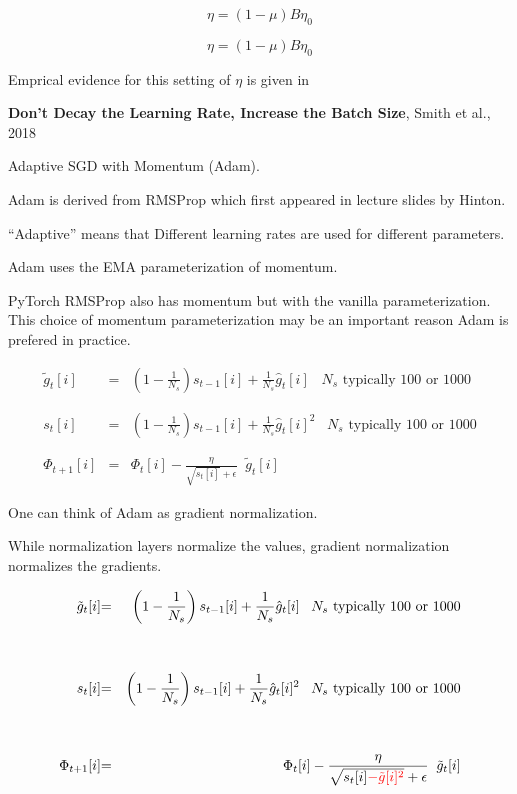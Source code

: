 {\vfill
{\color{red} $$\eta = (1-\mu)B\eta_0$$}


{\color{red} $$\eta = (1-\mu)B\eta_0$$}

\vfill
Emprical evidence for this setting of $\eta$ is given in

\vfill
{\bf Don't Decay the Learning Rate, Increase the Batch Size}, Smith et al., 2018


Adaptive SGD with Momentum (Adam).

\vfill
Adam is derived from RMSProp which first appeared in lecture slides by Hinton.

\vfill
``Adaptive'' means that Different learning rates are used for different parameters.


Adam uses the EMA parameterization of momentum.

\vfill
PyTorch RMSProp also has momentum but with the vanilla parameterization.
\vfill
This choice of momentum  parameterization may be an important reason Adam is prefered in practice.


\begin{eqnarray*}
{ \tilde{g}_t[i]} & { =} & { \left(1-\frac{1}{N_s}\right) s_{t-1}[i] + \frac{1}{N_s} \hat{g}_t[i]}\;\;\;\mbox{$N_s$ typically 100 or 1000} \\
\\
\\
{ s_t[i]} & { =} & { \left(1-\frac{1}{N_s}\right) s_{t-1}[i] + \frac{1}{N_s} \hat{g}_t[i]^2}\;\;\;\mbox{$N_s$ typically 100 or 1000} \\
\\
\\
{ \Phi_{t+1}[i]} & { =} & { \Phi_t[i] - \frac{\eta}{\sqrt{s_t[i]} + \epsilon}\;\; \tilde{g}_t[i]}
\end{eqnarray*}


One can think of Adam as gradient normalization.

\vfill
While normalization layers normalize the values, gradient normalization normalizes the gradients.


\begin{eqnarray*}
{ \tilde{g}_t[i]} & { =} & { \left(1-\frac{1}{N_s}\right) s_{t-1}[i] + \frac{1}{N_s} \hat{g}_t[i]}\;\;\;\mbox{$N_s$ typically 100 or 1000} \\
\\
\\
{ s_t[i]} & { =} & { \left(1-\frac{1}{N_s}\right) s_{t-1}[i] + \frac{1}{N_s} \hat{g}_t[i]^2}\;\;\;\mbox{$N_s$ typically 100 or 1000} \\
\\
\\
{ \Phi_{t+1}[i]} & { =} & { \Phi_t[i] - \frac{\eta}{\sqrt{s_t[i] {\color{red} - \tilde{g}[i]^2}} + \epsilon}\;\; \tilde{g}_t[i]}
\end{eqnarray*}

}

